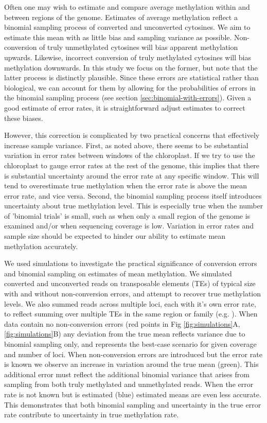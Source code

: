 \documentclass[twocolumn,twoside,lettersize]{article}
\begin{document}
Often one may wish to estimate and compare average methylation within and between regions of the genome.
Estimates of average methylation reflect a binomial sampling process of converted and unconverted cytosines.
We aim to estimate this mean with as little bias and sampling variance as possible.
Non-conversion of truly unmethylated cytosines will bias apparent methylation upwards.
Likewise, incorrect conversion of truly methylated cytosines will bias methylation downwards.
In this study we focus on the former, but note that the latter process is distinctly plausible.
Since these errors are statistical rather than biological, we can account for them by allowing for the probabilities of errors in the binomial sampling process (see section \ref{sec:binomial-with-errors}).
Given a good estimate of error rates, it is straightforward adjust estimates to correct these biases.

However, this correction is complicated by two practical concerns that effectively increase sample variance.
First, as noted above, there seems to be substantial variation in error rates between windows of the chloroplast.
If we try to use the chloroplast to gauge error rates at the rest of the genome, this implies that there is substantial uncertainty around the error rate at any specific window.
This will tend to overestimate true methylation when the error rate is above the mean error rate, and vice versa.
Second, the binomial sampling process itself introduces uncertainty about true methylation level.
This is especially true when the number of 'binomial trials' is small, such as when only a small region of the genome is examined and/or when sequencing coverage is low.
Variation in error rates and sample size should be expected to hinder our ability to estimate mean methylation accurately.

We used simulations to investigate the practical significance of conversion errors and binomial sampling on estimates of mean methylation.
We simulated converted and unconverted reads on transposable elements (TEs) of typical size with and without non-conversion errors, and attempt to recover true methylation levels.
We also summed reads across multiple loci, each with it's own error rate, to reflect summing over multiple TEs in the same region or family (e.g. \cite{sasaki2019common}).
When data contain no non-conversion errors (red points in Fig \ref{fig:simulations}A, \ref{fig:simulations}B) any deviation from the true mean reflects variance due to binomial sampling only, and represents the best-case scenario for given coverage and number of loci.
When non-conversion errors are introduced but the error rate is known we observe an increase in variation around the true mean (green).
This additional error must reflect the additional binomial variance that arises from sampling from both truly methylated and unmethylated reads.
When the error rate is not known but is estimated (blue) estimated means are even less accurate.
This demonstrates that both binomial sampling and uncertainty in the true error rate contribute to uncertainty in true methylation rate.
\end{document}
